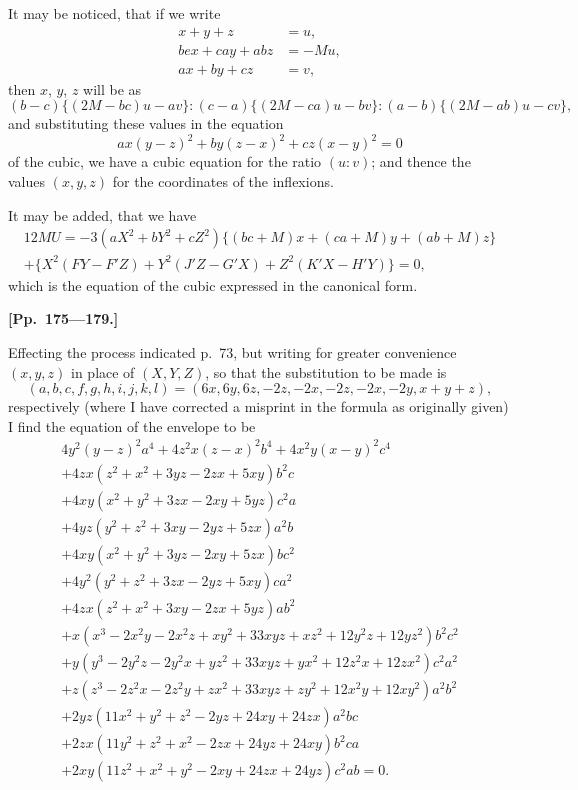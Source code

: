 \documentclass[11pt,a4paper]{article}
\theoremstyle{definition}
\begin{document}
It may be noticed, that if we write
\begin{align*}
x + y + z &= u, \\
bex + cay + abz &= -Mu, \\
ax + by + cz &= v,
\end{align*}
then $x$, $y$, $z$ will be as
\[
(b-c)\{(2M-bc)u - av\} : (c-a)\{(2M-ca)u - bv\} : (a-b)\{(2M-ab)u - cv\},
\]
and substituting these values in the equation
\[
ax(y-z)^2 + by(z-x)^2 + cz(x-y)^2 = 0
\]
of the cubic, we have a cubic equation for the ratio $(u:v)$; and thence the values $(x,y,z)$ for the coordinates of the inflexions.

It may be added, that we have
\begin{multline*}
12MU = -3(aX^2 + bY^2 + cZ^2)\{(bc+M)x + (ca+M)y + (ab+M)z\} \\
+ \{X^2(FY-F'Z) + Y^2(J'Z-G'X) + Z^2(K'X-H'Y)\} = 0,
\end{multline*}
which is the equation of the cubic expressed in the canonical form.

\bigskip

\noindent\textbf{[Pp.~175---179.]}

Effecting the process indicated p.~73, but writing for greater convenience $(x,y,z)$ in place of $(X,Y,Z)$, so that the substitution to be made is
\[
(a,b,c,f,g,h,i,j,k,l) = (6x, 6y, 6z, -2z, -2x, -2z, -2x, -2y, x+y+z),
\]
respectively (where I have corrected a misprint in the formula as originally given) I find the equation of the envelope to be
\begin{multline*}
4y^2(y-z)^2 a^4 + 4z^2x(z-x)^2 b^4 + 4x^2y(x-y)^2 c^4 \\
+ 4zx(z^2+x^2+3yz-2zx+5xy)b^2c \\
+ 4xy(x^2+y^2+3zx-2xy+5yz)c^2a \\
+ 4yz(y^2+z^2+3xy-2yz+5zx)a^2b \\
+ 4xy(x^2+y^2+3yz-2xy+5zx)bc^2 \\
+ 4y^2(y^2+z^2+3zx-2yz+5xy)ca^2 \\
+ 4zx(z^2+x^2+3xy-2zx+5yz)ab^2 \\
+ x(x^3-2x^2y-2x^2z+xy^2+33xyz+xz^2+12y^2z+12yz^2)b^2c^2 \\
+ y(y^3-2y^2z-2y^2x+yz^2+33xyz+yx^2+12z^2x+12zx^2)c^2a^2 \\
+ z(z^3-2z^2x-2z^2y+zx^2+33xyz+zy^2+12x^2y+12xy^2)a^2b^2 \\
+ 2yz(11x^2+y^2+z^2-2yz+24xy+24zx)a^2bc \\
+ 2zx(11y^2+z^2+x^2-2zx+24yz+24xy)b^2ca \\
+ 2xy(11z^2+x^2+y^2-2xy+24zx+24yz)c^2ab = 0.
\end{multline*}
\end{document}
